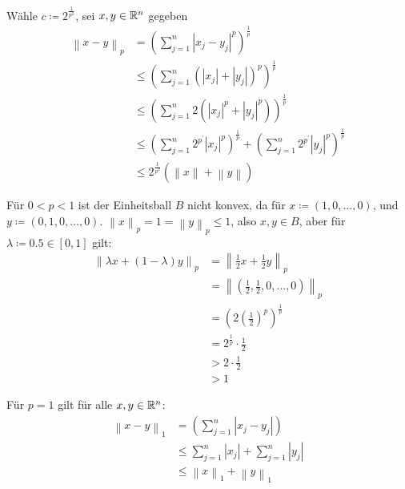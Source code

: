 \documentclass[sectionformat=aufgabe]{gadsescript}
\begin{document}
\begin{enumerate}[label=(\alph*)]
\begin{enumerate}[label=(\roman*)]
				Wähle $ c \coloneqq 2^{\frac{ 1 }{ p^2 } }  $, sei $ x, y \in \mathbb{R} ^n $ gegeben
				\begin{align*}
					\left\| x - y \right\| _p &= \left( \sum_{j=1}^{n} \left| x_j - y_j \right|^p \right)^{\frac{ 1 }{ p } }   \\
					~ &\leq \left( \sum_{j=1}^{n} \left( \left| x_j \right| + \left| y_j \right| \right)^p \right) ^{\frac{ 1 }{ p } } \\
					~ &\leq \left( \sum_{j=1}^{n} 2(\left| x_j \right| ^p + \left| y_j \right| ^p ) \right) ^{\frac{ 1 }{ p } } \\
					~ &\leq \left( \sum_{j=1}^{n} 2^{p^\prime } \left| x_j \right|^p  \right) ^{\frac{ 1 }{ p } } + \left( \sum_{j=1}^{n} 2^{p^\prime } \left| y_j \right| ^p \right) ^{\frac{ 1 }{ p } } \\
					~ &\leq 2^{\frac{ 1 }{ p^2 } } \left( \left\| x \right\| + \left\| y \right\|  \right) 
				\end{align*}
				
				
				
				
		\end{enumerate}

		Für $ 0 < p < 1 $ ist der Einheitsball $ B $ nicht konvex, da für
		$ x \coloneqq  \left( 1, 0, \dotsc, 0 \right)  $,
		und $ y \coloneqq \left( 0, 1, 0, \dotsc, 0 \right)  $.
		$ \left\| x \right\| _p = 1 = \left\| y \right\|_p \leq 1 $, also $ x, y \in B $, aber für $ \lambda \coloneqq 0.5 \in [0, 1] $ gilt:
		\begin{align*}
			\left\| \lambda x + ( 1 - \lambda) y \right\|_p &= \left\| \frac{ 1 }{ 2 } x + \frac{ 1 }{ 2 } y \right\|_p  \\
			&= \left\| \left( \frac{ 1 }{ 2 } , \frac{ 1 }{ 2 } , 0, \dotsc, 0 \right)  \right\|_p  \\
			&= \left( 2 \left( \frac{ 1 }{ 2 }  \right) ^p \right) ^{\frac{ 1 }{ p } }  \\
			&= 2^{\frac{ 1 }{ p } } \cdot \frac{ 1 }{ 2 }  \\
			&> 2 \cdot \frac{ 1 }{ 2 }  \\
			&> 1
		\end{align*}

		Für $ p = 1 $ gilt für alle $ x, y \in \mathbb{R} ^n $:
		\begin{align*}
			\left\| x - y \right\| _1 &= \left( \sum_{j=1}^{n} \left| x_j - y_j \right|  \right)  \\
			&\leq \sum_{j=1}^{n} \left| x_j \right| + \sum_{j=1}^{n} \left| y_j \right|  \\
			&\leq \left\| x \right\|_1 + \left\| y \right\|_1
		\end{align*}
		

\end{enumerate}
\end{document}
